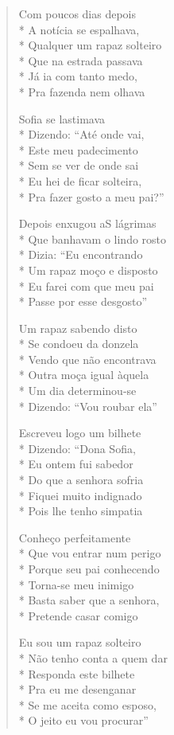 \begin{verse}
Com poucos dias depois\\*
A notícia se espalhava,\\*
Qualquer um rapaz solteiro\\*
Que na estrada passava\\*
Já ia com tanto medo,\\*
Pra fazenda nem olhava

Sofia se lastimava\\*
Dizendo: ``Até onde vai,\\*
Este meu padecimento\\*
Sem se ver de onde sai\\*
Eu hei de ficar solteira,\\*
Pra fazer gosto a meu pai?''

Depois enxugou aS lágrimas\\*
Que banhavam o lindo rosto\\*
Dizia: ``Eu encontrando\\*
Um rapaz moço e disposto\\*
Eu farei com que meu pai\\*
Passe por esse desgosto''

Um rapaz sabendo disto\\*
Se condoeu da donzela\\*
Vendo que não encontrava\\*
Outra moça igual àquela\\*
Um dia determinou-se\\*
Dizendo: ``Vou roubar ela''

Escreveu logo um bilhete\\*
Dizendo: ``Dona Sofia,\\*
Eu ontem fui sabedor\\*
Do que a senhora sofria\\*
Fiquei muito indignado\\*
Pois lhe tenho simpatia

Conheço perfeitamente\\*
Que vou entrar num perigo\\*
Porque seu pai conhecendo\\*
Torna-se meu inimigo\\*
Basta saber que a senhora,\\*
Pretende casar comigo

Eu sou um rapaz solteiro\\*
Não tenho conta a quem dar\\*
Responda este bilhete\\*
Pra eu me desenganar\\*
Se me aceita como esposo,\\*
O jeito eu vou procurar''


\end{verse}
